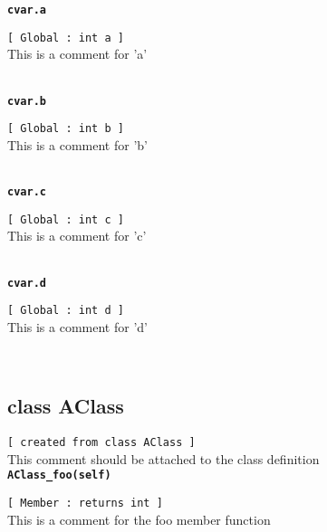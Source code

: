 {\tt \bf cvar.a }
\\
\makebox[0.5in]{}\begin{minipage}[t]{6in}
{\tt [ Global : int  a ]  }\\
   This is a comment for 'a'   
\\

\end{minipage}\\

{\tt \bf cvar.b }
\\
\makebox[0.5in]{}\begin{minipage}[t]{6in}
{\tt [ Global : int  b ]  }\\
   This is a comment for 'b'   
\\

\end{minipage}\\

{\tt \bf cvar.c }
\\
\makebox[0.5in]{}\begin{minipage}[t]{6in}
{\tt [ Global : int  c ]  }\\
   This is a comment for 'c'   
\\

\end{minipage}\\

{\tt \bf cvar.d }
\\
\makebox[0.5in]{}\begin{minipage}[t]{6in}
{\tt [ Global : int  d ]  }\\
   This is a comment for 'd'   
\\

\end{minipage}\\

\subsection{class AClass}{\tt [ created from class AClass ]  }\\
   This comment should be attached to the class definition   
\\{\tt \bf AClass\_foo(self) }
\\
\makebox[0.5in]{}\begin{minipage}[t]{6in}
{\tt [ Member : returns int  ]  }\\
   This is a comment for the foo member function   
\\

\end{minipage}\\

